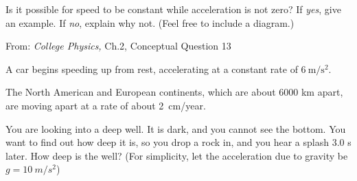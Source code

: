 \documentclass[addpoints,12pt]{exam}
\begin{document}
\begin{questions}
\question[2]
Is it possible for speed to be constant while acceleration is not zero? If \textit{yes}, give an example. If \textit{no}, explain why not. (Feel free to include a diagram.)

From: \textit{College Physics,} Ch.2, Conceptual Question 13
\vspace{2in}

	\question[4]
	A car begins speeding up from rest, accelerating at a constant rate of $6~\text{m}/\text{s}^2$.
	
	\question[4]
The North American and European continents, which are about 6000 km apart, are moving apart at a rate of about 2~cm/year.


	\question[3]
	You are looking into a deep well. It is dark, and you cannot see the bottom. You want to find out how deep it is, so you drop a rock in, and you hear a splash 3.0 s later. How deep is the well? (For simplicity, let the acceleration due to gravity be $g=10~m/s^2$)
	

\end{questions}
\end{document}
